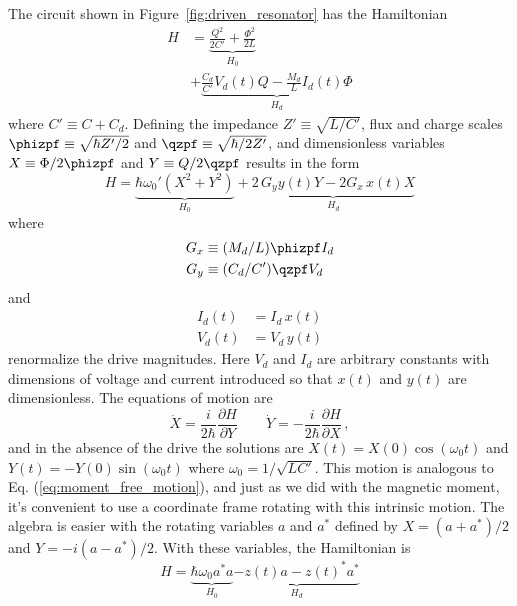 
The circuit shown in Figure~\ref{fig:driven_resonator} has the Hamiltonian
\begin{align}
  H
  &= \underbrace{\frac{Q^2}{2C'} + \frac{\Phi^2}{2L}}_{H_0} \nonumber \\
  &+ \underbrace{\frac{C_d}{C'}V_d(t) Q
  - \frac{M_d}{L} I_d(t) \Phi}_{H_d} \label{eq:drive_hamiltonian_lab_frame}
\end{align}
where $C' \equiv C + C_d$.
Defining the impedance $Z' \equiv \sqrt{L / C'}$, flux and charge scales $\phizpf \equiv \sqrt{\hbar Z' / 2}$ and $\qzpf \equiv \sqrt{\hbar / 2 Z'}$, and dimensionless variables $X \equiv \Phi / 2 \phizpf$ and $Y \equiv Q / 2 \qzpf$ results in the form
\begin{equation}
  H = \underbrace{\hbar \omega_0' (X^2 + Y^2)}_{H_0}
  + \underbrace{2 \, G_y y(t) Y - 2 G_x \, x(t) X}_{H_d}
\end{equation}
where
\begin{align*}
  G_x & \equiv (M_d / L) \phizpf I_d \\
  G_y & \equiv (C_d / C') \qzpf V_d
\end{align*}
and
\begin{align*}
  I_d(t) & = I_d \, x(t) \\
  V_d(t) & = V_d \, y(t)
\end{align*}
renormalize the drive magnitudes.
Here $V_d$ and $I_d$ are arbitrary constants with dimensions of voltage and current introduced so that $x(t)$ and $y(t)$ are dimensionless.
The equations of motion are
\begin{equation}
  \dot{X} =  \frac{i}{2 \hbar} \frac{\partial H}{\partial Y}
  \qquad
  \dot{Y} = -\frac{i}{2 \hbar} \frac{\partial H}{\partial X}
  \, ,
\end{equation}
and in the absence of the drive the solutions are $X(t) =   X(0) \cos(\omega_0 t)$ and $Y(t) = - Y(0) \sin(\omega_0 t)$ where $\omega_0 = 1 / \sqrt{L C'}$.
This motion is analogous to Eq. (\ref{eq:moment_free_motion}), and just as we did with the magnetic moment, it's convenient to use a coordinate frame rotating with this intrinsic motion.
The algebra is easier with the rotating variables $a$ and $a^*$ defined by $X = (a + a^*)/2$ and $Y = -i(a - a^*)/2$.
With these variables, the Hamiltonian is
\begin{equation}
  H = \underbrace{\hbar \omega_0 a^* a}_{H_0}
  \underbrace{- z(t) a - z(t)^* a^*}_{H_d}
\end{equation}
